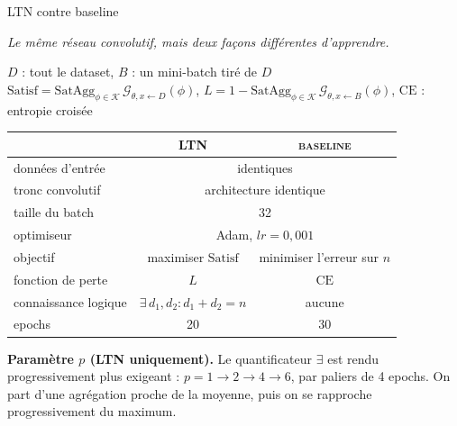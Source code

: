 \documentclass[aspectratio=169,10pt]{beamer}
\newcommand{\G}{\mathcal{G}}                      %
\newcommand{\KB}{\mathcal{K}}                     %
\newcommand{\SatAgg}{\mathrm{SatAgg}}
\begin{document}
\begin{frame}{LTN contre baseline}
  \scriptsize
  \begin{center}
    \footnotesize\itshape Le même réseau convolutif, mais deux façons
    différentes d'apprendre.
  \end{center}

  \begin{center}
    $D$ : tout le dataset, $B$ : un mini-batch tiré de $D$ \\[0.2em]
    $\text{Satisf} = \SatAgg_{\phi\in\KB}\,\G_{\theta,x\leftarrow D}(\phi)$,
    \quad $L = 1-\SatAgg_{\phi\in\KB}\,\G_{\theta,x\leftarrow B}(\phi)$,
    \quad $\text{CE}$ : entropie croisée
  \end{center}

  \renewcommand{\arraystretch}{1.0}
  \begin{center}
  \begin{tabular}{@{} l c c @{}}
    \toprule
    & {\color{accent}\scshape\footnotesize LTN} &
      {\color{ash}\scshape\footnotesize baseline} \\
    \midrule
    données d'entrée & \multicolumn{2}{c}{identiques} \\
    tronc convolutif & \multicolumn{2}{c}{architecture identique} \\
    taille du batch & \multicolumn{2}{c}{32} \\
    optimiseur & \multicolumn{2}{c}{Adam, $lr=0{,}001$} \\
    \midrule
    objectif & maximiser $\text{Satisf}$ &
      minimiser l'erreur sur $n$ \\
    fonction de perte & $L$ & $\text{CE}$ \\
    connaissance logique & $\exists\,d_1,d_2 : d_1+d_2=n$ & aucune \\
    \midrule
    epochs & 20 & 30 \\
    \bottomrule
  \end{tabular}
  \end{center}

  \vspace{0.3em}
  \textbf{Paramètre $p$ (LTN uniquement).} Le quantificateur $\exists$ est
  rendu progressivement plus exigeant : $p=1\rightarrow2\rightarrow4
  \rightarrow6$, par paliers de 4 epochs. On part d'une agrégation proche
  de la moyenne, puis on se rapproche progressivement du maximum.
\end{frame}
\end{document}
